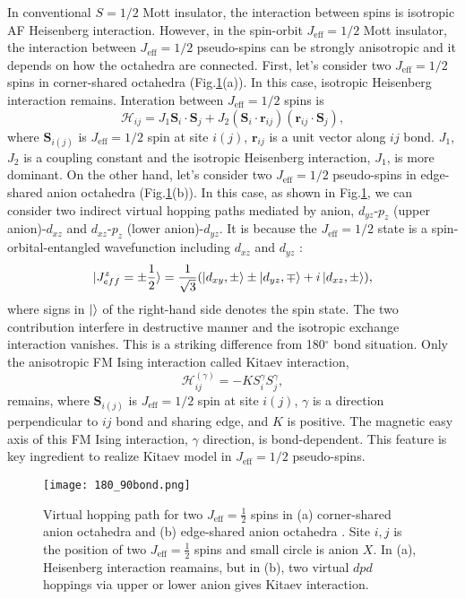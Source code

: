 \documentclass[a4,10.5pt]{report}
\begin{document}
In conventional $S = 1/2$ Mott insulator, the interaction between spins is isotropic AF Heisenberg interaction.
However, in the spin-orbit $J_\mathrm{eff} = 1/2$ Mott insulator, the interaction between $J_\mathrm{eff} = 1/2$ pseudo-spins can be strongly anisotropic \cite{jackeli2009mott}
and it depends on how the octahedra are connected.
First, let's consider two $J_\mathrm{eff} = 1/2$ spins in corner-shared octahedra (Fig.\ref{180_90bond}(a)).
In this case, isotropic Heisenberg interaction remains.
Interation between $J_\mathrm{eff} = 1/2$ spins is 
\begin{equation}
\mathcal{H}_{ij} = J_1\bm{S}_i\cdot\bm{S}_j + J_2(\bm{S}_i\cdot\bm{r}_{ij})(\bm{r}_{ij}\cdot\bm{S}_j),
\end{equation}
where $\bm{S}_{i(j)}$ is  $J_{\mathrm{eff}} = 1/2$ spin at site $i(j)$, $\bm{r}_{ij}$ is a unit vector along $ij$ bond.
$J_1$, $J_2$ is a coupling constant and the isotropic Heisenberg interaction, $J_1$, is more dominant.
On the other hand, let's consider two $J_\mathrm{eff} = 1/2$ pseudo-spins in edge-shared anion octahedra (Fig.\ref{180_90bond}(b)).
In this case, as shown in Fig.\ref{180_90bond}, we can consider two indirect virtual hopping paths mediated by anion, 
$d_{yz}$-$p_z$ (upper anion)-$d_{xz}$ and $d_{xz}$-$p_z$ (lower anion)-$d_{yz}$.
It is because the $J_{\mathrm{eff}} = 1/2$ state is a spin-orbital-entangled wavefunction including $d_{xz}$ and $d_{yz}$ \cite{jackeli2009mott}:
\begin{align}
\ket{J^z_{eff} = \pm \frac{1}{2}} = \frac{1}{\sqrt{3}}(\ket{d_{xy}, \pm}\pm\ket{d_{yz}, \mp}+i\ket{d_{xz}, \pm}),
\label{Jeff} 
\end{align}
where signs in $\ket{}$ of the right-hand side denotes the spin state.
The two contribution interfere in destructive manner and the isotropic exchange interaction vanishes.
This is a striking difference from 180$^\circ$ bond situation.
Only the anisotropic FM Ising interaction called Kitaev interaction,
\begin{equation}
\mathcal{H}^{(\gamma)}_{ij} = -KS^\gamma_iS^\gamma_j,
\label{Kitaev}
\end{equation}
remains, where $\bm{S}_{i(j)}$ is  $J_{\mathrm{eff}} = 1/2$ spin at site $i(j)$, $\gamma$ is a direction perpendicular to $ij$ bond and sharing edge, and $K$ is positive.
The magnetic easy axis of this FM Ising interaction, $\gamma$ direction, is bond-dependent.
This feature is key ingredient to realize Kitaev model in $J_{\mathrm{eff}} = 1/2$ pseudo-spins.

\begin{figure}
  \centering
  \texttt{[image: 180\_90bond.png]}
  \caption{Virtual hopping path for two $J_{\mathrm{eff}} = \frac{1}{2}$ spins in (a) corner-shared anion octahedra and (b) edge-shared anion octahedra \cite{jackeli2009mott}.
  Site $i, j$ is the position of two $J_{\mathrm{eff}} = \frac{1}{2}$ spins and small circle is anion $X$.
  In (a), Heisenberg interaction reamains, but in (b), two virtual $dpd$ hoppings via upper or lower anion gives Kitaev interaction.}
  \label{180_90bond}
\end{figure}
\end{document}
